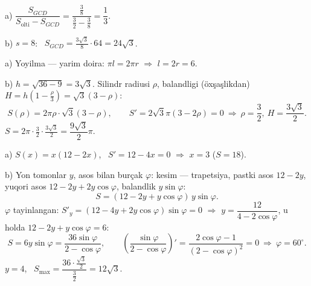 a) $\dfrac{S_{GCD}}{S_{\text{olti}}-S_{GCD}}=\dfrac{\frac38}{\frac32-\frac38}=\dfrac13$.

b) $s=8$: \ $S_{GCD}=\frac{3\sqrt3}8\cdot64=24\sqrt3$.

\newpage
{}
a) Yoyilma — yarim doira: $\pi l=2\pi r$ $\Rightarrow$ $l=2r=6$.

b) $h=\sqrt{36-9}=3\sqrt3$. Silindr radiusi $\rho$, balandligi (öxşaşlikdan) $H=h\left(1-\frac\rho3\right)=\sqrt3(3-\rho)$:
\[S(\rho)=2\pi\rho\cdot\sqrt3(3-\rho),\qquad S'=2\sqrt3\pi(3-2\rho)=0\ \Rightarrow\ \rho=\frac32,\ H=\frac{3\sqrt3}2.\]
$S=2\pi\cdot\frac32\cdot\frac{3\sqrt3}2=\dfrac{9\sqrt3}2\pi$.

\newpage
{}
a) $S(x)=x(12-2x)$, \ $S'=12-4x=0$ $\Rightarrow$ $x=3$ ($S=18$).

b) Yon tomonlar $y$, asos bilan burçak $\varphi$: kesim — trapetsiya, pastki asos $12-2y$, yuqori asos $12-2y+2y\cos\varphi$, balandlik $y\sin\varphi$:
\[S=(12-2y+y\cos\varphi)\,y\sin\varphi.\]
$\varphi$ tayinlangan: $S'_y=(12-4y+2y\cos\varphi)\sin\varphi=0$ $\Rightarrow$ $y=\dfrac{12}{4-2\cos\varphi}$, u holda $12-2y+y\cos\varphi=6$:
\[S=6y\sin\varphi=\frac{36\sin\varphi}{2-\cos\varphi},\qquad \left(\frac{\sin\varphi}{2-\cos\varphi}\right)'=\frac{2\cos\varphi-1}{(2-\cos\varphi)^2}=0\ \Rightarrow\ \varphi=60^\circ.\]
$y=4$, \ $S_{\max}=\dfrac{36\cdot\frac{\sqrt3}2}{\frac32}=12\sqrt3$.

\ShowJavoblar

